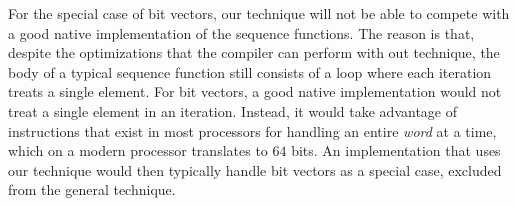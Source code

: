 For the special case of bit vectors, our technique will not be able to
compete with a good native implementation of the sequence functions.
The reason is that, despite the optimizations that the compiler can
perform with out technique, the body of a typical sequence function
still consists of a loop where each iteration treats a single
element.  For bit vectors, a good native implementation would not
treat a single element in an iteration.  Instead, it would take
advantage of instructions that exist in most processors for handling
an entire \emph{word} at a time, which on a modern processor
translates to $64$ bits.  An implementation that uses our technique
would then typically handle bit vectors as a special case, excluded
from the general technique.
